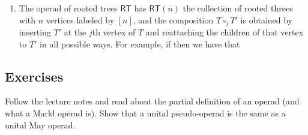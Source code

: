 \documentclass[fleqn, a4paper, twoside]{article}
\makeatletter
\newcommand{\0}{\langle 0\rangle}
\newenvironment{tenumerate}{
 \begin{enumerate}
  \setlength{\itemsep}{0pt}
  \setlength{\parskip}{0pt}
}{\end{enumerate}}
\let\[\@undefined
\DeclareRobustCommand{\[}{\begin{equation}}%
\let\]\@undefined
\DeclareRobustCommand{\]}{\end{equation}}%
\theoremstyle{mytheorem}
\theoremstyle{introthm}
\theoremstyle{mydefinition}
\theoremstyle{mydefinition2}
\theoremstyle{plain} %
\newcommand{\?}{\,?\,}
\theoremstyle{mytheorem}
\theoremstyle{plain} %
\makeatother
\begin{document}
\begin{tenumerate}
 \item The operad of rooted trees $\mathsf{RT}$ has
 $\mathsf{RT}(n)$ the collection of rooted threes with $n$
 vertices labeled by $[n]$, and the composition $T \circ_j T'$
  is obtained by inserting $T'$ at the $j$th vertex of $T$
  and reattaching the children of that vertex to $T'$ in
  all possible ways. For example, if
then we have that  
\end{tenumerate}
\subsection{Exercises}

 \begin{question}
 Follow the lecture notes and read about the
 partial definition of an operad (and what
 a Markl operad is). Show that a unital
 pseudo-operad is the same as a unital 
 May operad. 
 \end{question}
 
\end{document}
